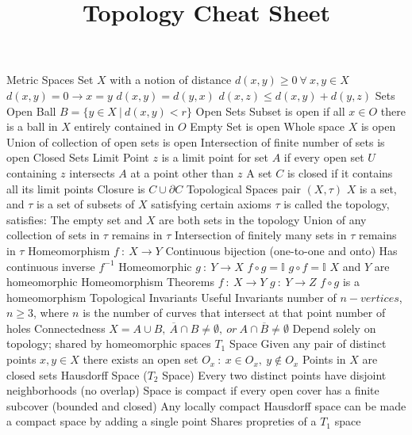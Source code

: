 \documentclass[14pt]{extarticle}
\title{Topology Cheat Sheet}
\begin{document}
	\maketitle

	
	\begin{outline}		
		\1	Metric Spaces
			\2	Set $X$ with a notion of distance
				\3	$d(x,y) \ge 0~\forall~x,y \in X$
				\3	$d(x,y) = 0 \rightarrow x = y$
				\3	$d(x,y) = d(y,x)$
				\3	$d(x,z) \le d(x,y) + d(y,z)$
		\1	Sets
			\2	Open Ball $B = \{y \in X~|~d(x,y) < r\}$
			\2	Open Sets
				\3	Subset is open if all $x \in O$ there is a ball in $X$ entirely contained in $O$
				\3	Empty Set is open
				\3	Whole space $X$ is open
				\3	Union of collection of open sets is open
				\3	Intersection of finite number of sets is open
			\2	Closed Sets
				\3	Limit Point
					\4	$z$ is a limit point for set $A$ if every open set $U$ containing $z$ intersects $A$ at a point other than $z$
				\3	A set $C$ is closed if it contains all its limit points
				\3	Closure is $C \cup \partial C$
		\1	Topological Spaces
			\2	pair $(X,\tau)$
				\3	$X$ is a set, and $\tau$ is a set of subsets of $X$ satisfying certain axioms
				\3	$\tau$ is called the topology, satisfies:
					\4	The empty set and $X$ are both sets in the topology
					\4	Union of any collection of sets in $\tau$ remains in $\tau$
					\4	Intersection of finitely many sets in $\tau$ remains in $\tau$
		\1	Homeomorphism
			\2	$f~:~X \rightarrow Y$ 
				\3	Continuous bijection (one-to-one and onto)
				\3	Has continuous inverse $f^{-1}$
			\2	Homeomorphic
				\3	$g~:~Y \rightarrow X$ 
				\3	$f \circ g = \mathbb{I}$
				\3	$g \circ f = \mathbb{I}$
				\3	$X$ and $Y$ are homeomorphic
			\2	Homeomorphism Theorems
				\3	$f~:~X\rightarrow Y$ $g~:~Y\rightarrow Z$
				\3	$f \circ g$ is a homeomorphism
		\1	Topological Invariants
			\2	Useful Invariants
				\3	number of $n-vertices$, $n \ge 3$, where $n$ is the number of curves that intersect at that point
				\3	number of holes
				\3	Connectedness
					\4	$X = A \cup B,~\overline{A} \cap B \ne \emptyset,~or~A \cap \overline{B} \ne \emptyset$
			\2	Depend solely on topology; shared by homeomorphic spaces
			\2	$T_1$ Space	
				\3	Given any pair of distinct points $x,y \in X$ there exists an open set $O_x~:~x \in O_x,~y \notin O_x$
				\3	Points in $X$ are closed sets
			\2	Hausdorff Space ($T_2$ Space)
				\3	Every two distinct points have disjoint neighborhoods (no overlap)
				\3	Space is compact if every open cover has a finite subcover (bounded and closed)
				\3	Any locally compact Hausdorff space can be made a compact space by adding a single point
				\3	Shares propreties of a $T_1$ space


\end{outline}
\end{document}
